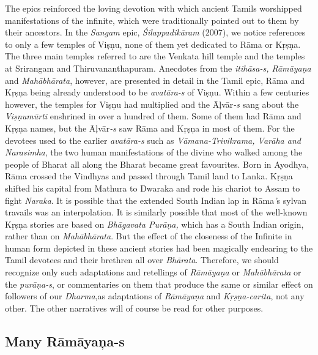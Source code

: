 The epics reinforced the loving devotion with which ancient Tamils worshipped manifestations of the infinite, which were traditionally pointed out to them by their ancestors. In the \textit{Sangam} epic, \textit{Śilappadikāram} (2007), we notice references to only a few temples of Viṣṇu, none of them yet dedicated to Rāma or Kṛṣṇa. The three main temples referred to are the Venkata hill temple and the temples at Srirangam and Thiruvananthapuram. Anecdotes from the \textit{itihāsa-s, Rāmāyaṇa} and \textit{Mahābhārata}, however, are presented in detail in the Tamil epic, Rāma and Kṛṣṇa being already understood to be \textit{avatāra-s} of Viṣṇu. Within a few centuries however, the temples for Viṣṇu had multiplied and the Āļvār\textit{-s} sang about the \textit{Viṣṇumūrti} enshrined in over a hundred of them. Some of them had Rāma and Kṛṣṇa names, but the Āļvār\textit{-s} saw Rāma and Kṛṣṇa in most of them. For the devotees used to the earlier \textit{avatāra-s} such as \textit{Vāmana-Trivikrama, Varāha and Narasimha}, the two human manifestations of the divine who walked among the people of Bharat all along the Bharat became great favourites. Born in Ayodhya, Rāma crossed the Vindhyas and passed through Tamil land to Lanka. Kṛṣṇa shifted his capital from Mathura to Dwaraka and rode his chariot to Assam to fight \textit{Naraka}. It is possible that the extended South Indian lap in Rāma\textit{’}s sylvan travails was an interpolation. It is similarly possible that most of the well-known Kṛṣṇa stories are based on \textit{Bhāgavata Purāṇa,} which has a South Indian origin, rather than on \textit{Mahābhārata}. But the effect of the closeness of the Infinite in human form depicted in these ancient stories had been magically endearing to the Tamil devotees and their brethren all over \textit{Bhārata}. Therefore, we should recognize only such adaptations and retellings of \textit{Rāmāyaṇa} or \textit{Mahābhārata} or the \textit{purāṇa-s}, or commentaries on them that produce the same or similar effect on followers of our \textit{Dharma},as adaptations of \textit{Rāmāyaṇa} and \textit{Kṛṣṇa-carita}, not any other. The other narratives will of course be read for other purposes.


\subsection*{Many Rāmāyaņa-s}

